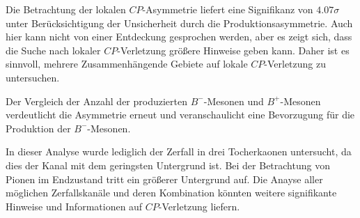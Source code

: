 Die Betrachtung der lokalen $CP$-Asymmetrie liefert eine Signifikanz
von $4.07\sigma$ unter Berücksichtigung der Unsicherheit durch die
Produktionsasymmetrie. Auch hier kann nicht von einer Entdeckung
gesprochen werden, aber es zeigt sich, dass die Suche nach lokaler $CP$-Verletzung
größere Hinweise geben kann. Daher ist es sinnvoll, mehrere Zusammenhängende
Gebiete auf lokale $CP$-Verletzung zu untersuchen. \par

Der Vergleich der Anzahl der produzierten $B^-$-Mesonen und $B^+$-Mesonen
verdeutlicht die Asymmetrie erneut und veranschaulicht eine Bevorzugung für die
Produktion der $B^-$-Mesonen. \par

In dieser Analyse wurde lediglich der Zerfall in drei Tocherkaonen untersucht, da
dies der Kanal mit dem geringsten Untergrund ist. Bei der Betrachtung von Pionen
im Endzustand tritt ein größerer Untergrund auf. Die Anayse aller möglichen
Zerfallskanäle und deren Kombination könnten weitere signifikante Hinweise und
Informationen auf $CP$-Verletzung liefern.
